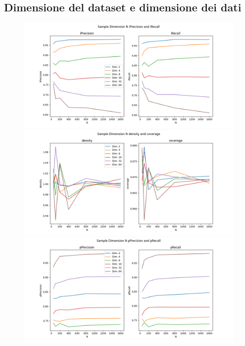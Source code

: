 \endgroup

\subsection{Dimensione del dataset e dimensione dei dati}

\begin{figure}[h!]
    \centering
    \includegraphics[width=\linewidth]{../images/toyexperiments/ksampledim/sampleDimN_iPrecision_iRecall.png} 
    \includegraphics[width=\linewidth]{../images/toyexperiments/ksampledim/sampleDimN_density_coverage.png} 
    \includegraphics[width=\linewidth]{../images/toyexperiments/ksampledim/sampleDimN_pPrecision_pRecall.png} 

\end{figure}
